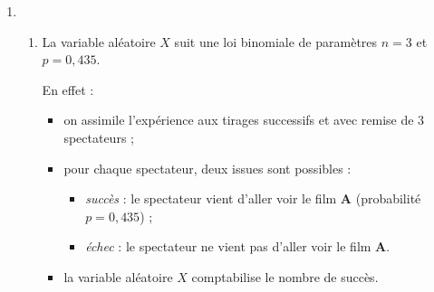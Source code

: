 \begin{corrige}
\begin{enumerate}
{               \par
               Dans le cas présent, on sait que l'événement $A$ est vérifié et on souhaite déterminer la probabilité de l'événement $R$. On recherche donc $p_A(R)$.
          }
          \par
          D'après la formule des probabilités conditionnelles :
          \par
          $p_A(R)=\dfrac{p(A\cap R)}{p(A)}=\dfrac{0,3 \times 0,4}{0,435}$\nosp$=\dfrac{0,12}{0,435} \approx 0,276\ $ (à $10^{-3}$ près).
          \item %
          \begin{enumerate}[label=\alph*.]
               \item %
               La variable aléatoire $X$ suit une loi binomiale de paramètres ${n=3}$ et ${p=0,435}$.
               \par
               En effet :
               \par
               \begin{itemize}
                    \item on assimile l'expérience aux tirages successifs et avec remise de 3 spectateurs ;
                    \item pour chaque spectateur, deux issues sont possibles :
                    \begin{itemize}
                         \item \textit{succès} : le spectateur vient d'aller voir le film \textbf{A} (probabilité $p=0,435$) ;
                         \item \textit{échec} : le spectateur ne vient pas d'aller voir le film \textbf{A}.
                    \end{itemize}
                    \item la variable aléatoire $X$ comptabilise le nombre de succès.
               \end{itemize}

\end{enumerate}
\end{enumerate}
\end{corrige}
